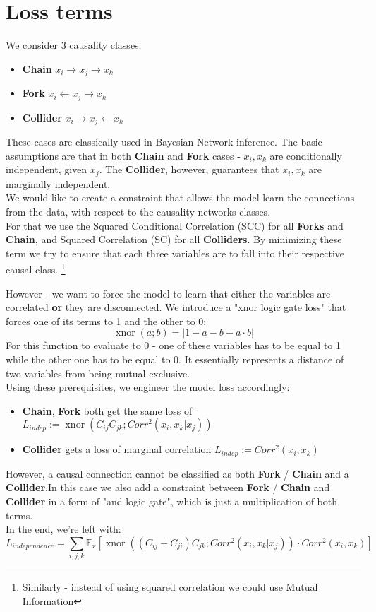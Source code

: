 \documentclass{article}
\DeclareMathOperator{\xnor}{xnor}
\newcommand{\EE}{\mathbb{E}}
\begin{document}
	\section{Loss terms}
	We consider 3 causality classes:
	\begin{itemize}
		\item \textbf{Chain} $x_i \to x_j \to x_k$
		\item \textbf{Fork} $x_i \leftarrow x_j \rightarrow x_k$
		\item \textbf{Collider} $x_i \rightarrow x_j \leftarrow x_k$
	\end{itemize}
	These cases are classically used in Bayesian Network inference. The basic assumptions are that in both \textbf{Chain} and \textbf{Fork} cases - $x_i, x_k$ are conditionally independent, given $x_j$. The \textbf{Collider}, however, guarantees that $x_i, x_k$ are marginally independent. \\
	We would like to create a constraint that allows the model learn the connections from the data, with respect to the causality networks classes. \\
	For that we use the Squared Conditional Correlation (SCC) for all \textbf{Forks} and \textbf{Chain}, and Squared Correlation (SC) for all \textbf{Colliders}. By minimizing these term we try to ensure that each three variables are to fall into their respective causal class. \footnote{Similarly - instead of using squared correlation we could use Mutual Information} \par
	However - we want to force the model to learn that either the variables are correlated \textbf{or} they are disconnected. We introduce a "xnor logic gate loss" that forces one of its terms to 1 and the other to 0:
	\begin{equation*}
	\xnor(a; b) = |1 - a - b - a \cdot b|
	\end{equation*}
	For this function to evaluate to 0 - one of these variables has to be equal to 1 while the other one has to be equal to 0. It essentially represents a distance of two variables from being mutual exclusive. \\
	Using these prerequisites, we engineer the model loss accordingly:
	\begin{itemize}
		\item \textbf{Chain}, \textbf{Fork} both get the same loss of 
		$L_{indep} := \xnor(C_{ij}C_{jk}; Corr^2(x_i, x_k | x_j))$ 
		\item \textbf{Collider} gets a loss of marginal correlation 
		$L_{indep} := Corr^2(x_i, x_k)$ 
	\end{itemize}
	However, a causal connection cannot be classified as both \textbf{Fork} / \textbf{Chain} and a \textbf{Collider}.In this case we also add a constraint between \textbf{Fork} / \textbf{Chain} and \textbf{Collider} in a form of "and logic gate", which is just a multiplication of both terms. \\
	In the end, we're left with:
	\begin{equation}
	L_{independence} = \sum_{i, j, k} \EE_x \left[
	\xnor((C_{ij} + C_{ji})C_{jk}; Corr^2(x_i, x_k | x_j))\cdot Corr^2(x_i, x_k)
	\right]
	\end{equation}
	\par
	
\end{document}
